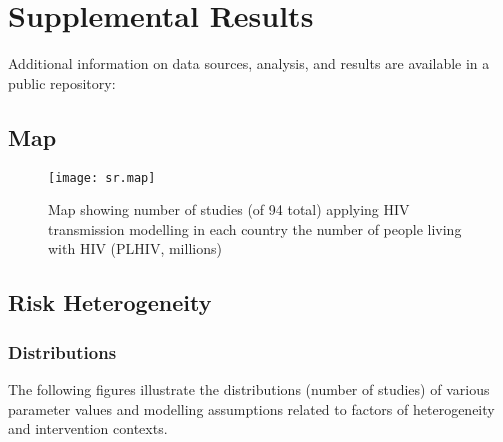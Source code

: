 \clearpage %
\section{Supplemental Results}\label{app.sr.res}
Additional information on data sources, analysis, and results are available
in a public repository:\\
\subsection{Map}\label{app.sr.res.map}
\begin{figure}[h]
  \centering
  \texttt{[image: sr.map]}
  \caption{Map showing number of studies (of 94 total)
    applying HIV transmission modelling in each country \vs
    the number of people living with HIV (PLHIV, millions)}
  \label{fig:sr.map}
\end{figure}
\subsection{Risk Heterogeneity}\label{app.sr.res.risk}
\subsubsection{Distributions}
The following figures illustrate the distributions (number of studies)
of various parameter values and modelling assumptions related to
factors of heterogeneity and intervention contexts.
\par\bigskip
{}
\clearpage
